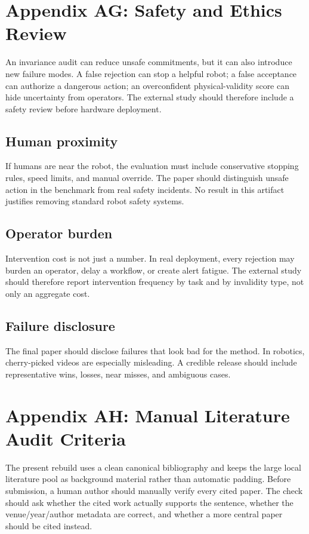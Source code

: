 \documentclass{article}
\begin{document}
\section{Appendix AG: Safety and Ethics Review}
An invariance audit can reduce unsafe commitments, but it can also introduce new failure modes. A false rejection can stop a helpful robot; a false acceptance can authorize a dangerous action; an overconfident physical-validity score can hide uncertainty from operators. The external study should therefore include a safety review before hardware deployment.

\subsection{Human proximity}
If humans are near the robot, the evaluation must include conservative stopping rules, speed limits, and manual override. The paper should distinguish unsafe action in the benchmark from real safety incidents. No result in this artifact justifies removing standard robot safety systems.

\subsection{Operator burden}
Intervention cost is not just a number. In real deployment, every rejection may burden an operator, delay a workflow, or create alert fatigue. The external study should therefore report intervention frequency by task and by invalidity type, not only an aggregate cost.

\subsection{Failure disclosure}
The final paper should disclose failures that look bad for the method. In robotics, cherry-picked videos are especially misleading. A credible release should include representative wins, losses, near misses, and ambiguous cases.


\section{Appendix AH: Manual Literature Audit Criteria}
The present rebuild uses a clean canonical bibliography and keeps the large local literature pool as background material rather than automatic padding. Before submission, a human author should manually verify every cited paper. The check should ask whether the cited work actually supports the sentence, whether the venue/year/author metadata are correct, and whether a more central paper should be cited instead.
\end{document}
